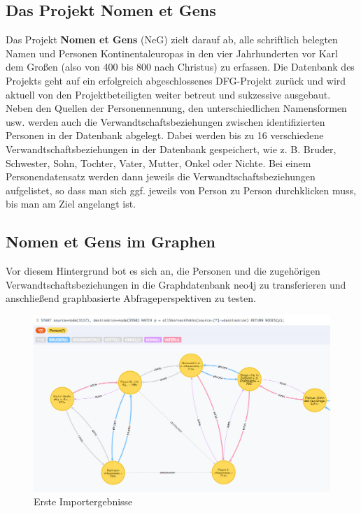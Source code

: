 \hypertarget{das-projekt-nomen-et-gens}{%
\subsection{Das Projekt Nomen et Gens}\label{das-projekt-nomen-et-gens}}

Das Projekt \textbf{Nomen et Gens} (NeG) zielt darauf ab, alle
schriftlich belegten Namen und Personen Kontinentaleuropas in den vier
Jahrhunderten vor Karl dem Großen (also von 400 bis 800 nach Christus)
zu erfassen. Die Datenbank des Projekts geht auf ein erfolgreich
abgeschlossenes DFG-Projekt zurück und wird aktuell von den
Projektbeteiligten weiter betreut und sukzessive ausgebaut. Neben den
Quellen der Personennennung, den unterschiedlichen Namensformen usw.
werden auch die Verwandtschaftsbeziehungen zwischen identifizierten
Personen in der Datenbank abgelegt. Dabei werden bis zu 16 verschiedene
Verwandtschaftsbeziehungen in der Datenbank gespeichert, wie z. B.
Bruder, Schwester, Sohn, Tochter, Vater, Mutter, Onkel oder Nichte. Bei
einem Personendatensatz werden dann jeweils die
Verwandtschaftsbeziehungen aufgelistet, so dass man sich ggf. jeweils
von Person zu Person durchklicken muss, bis man am Ziel angelangt ist.

\hypertarget{nomen-et-gens-im-graphen}{%
\subsection{Nomen et Gens im Graphen}\label{nomen-et-gens-im-graphen}}

Vor diesem Hintergrund bot es sich an, die Personen und die zugehörigen
Verwandtschaftsbeziehungen in die Graphdatenbank neo4j zu transferieren
und anschließend graphbasierte Abfrageperspektiven zu testen.

\begin{figure}
\centering
\includegraphics{Bilder/NeG/020-Verwandschaften.jpg}
\caption{Erste Importergebnisse}
\end{figure}

